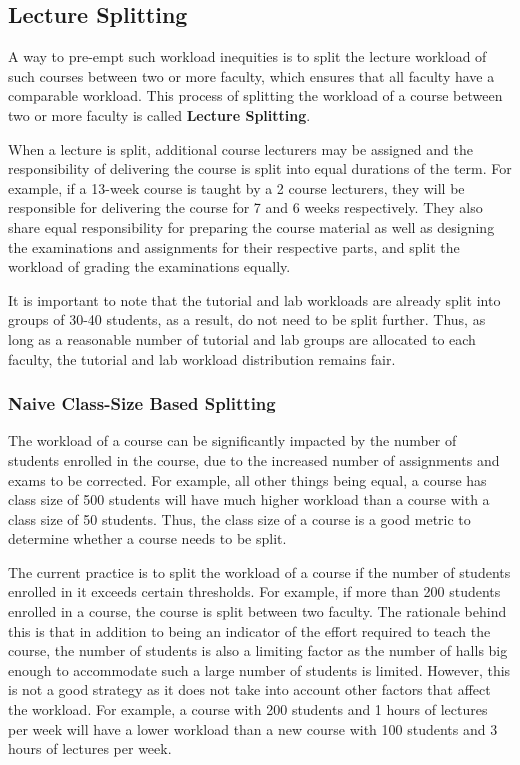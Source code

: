 \subsection{Lecture Splitting}

A way to pre-empt such workload inequities is to split the lecture workload of such courses between two or more faculty, which ensures that all faculty have a comparable workload. This process of splitting the workload of a course between two or more faculty is called \textbf{Lecture Splitting}.

When a lecture is split, additional course lecturers may be assigned and the responsibility of delivering the course is split into equal durations of the term. For example, if a 13-week course is taught by a 2 course lecturers, they will be responsible for delivering the course for 7 and 6 weeks respectively. They also share equal responsibility for preparing the course material as well as designing the examinations and assignments for their respective parts, and split the workload of grading the examinations equally.

It is important to note that the tutorial and lab workloads are already split into groups of 30-40 students, as a result, do not need to be split further. Thus, as long as a reasonable number of tutorial and lab groups are allocated to each faculty, the tutorial and lab workload distribution remains fair.


\subsubsection{Naive Class-Size Based Splitting}

The workload of a course can be significantly impacted by the number of students enrolled in the course, due to the increased number of assignments and exams to be corrected. For example, all other things being equal, a course has class size of 500 students will have much higher workload than a course with a class size of 50 students. Thus, the class size of a course is a good metric to determine whether a course needs to be split.

The current practice is to split the workload of a course if the number of students enrolled in it exceeds certain thresholds. For example, if more than 200 students enrolled in a course, the course is split between two faculty. The rationale behind this is that in addition to being an indicator of the effort required to teach the course, the number of students is also a limiting factor as the number of halls big enough to accommodate such a large number of students is limited. However, this is not a good strategy as it does not take into account other factors that affect the workload. For example, a course with 200 students and 1 hours of lectures per week will have a lower workload than a new course with 100 students and 3 hours of lectures per week.

